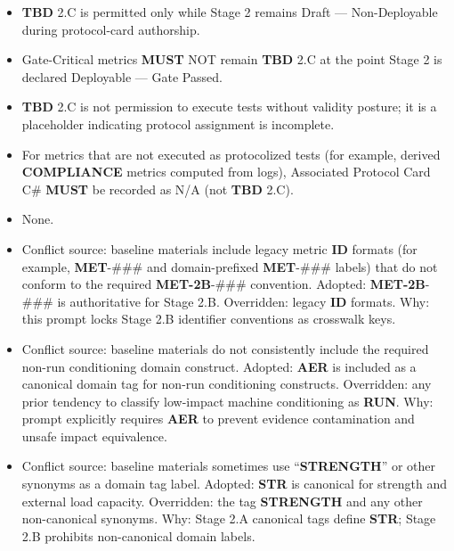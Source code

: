 \documentclass[10pt]{article}
\begin{document}
\begin{itemize}
\item \textbf{TBD} 2.C is permitted only while Stage 2 remains Draft — Non-Deployable during protocol-card authorship.
\item Gate-Critical metrics \textbf{MUST} NOT remain \textbf{TBD} 2.C at the point Stage 2 is declared Deployable — Gate Passed.
\item \textbf{TBD} 2.C is not permission to execute tests without validity posture; it is a placeholder indicating protocol assignment is incomplete.
\item For metrics that are not executed as protocolized tests (for example, derived \textbf{COMPLIANCE} metrics computed from logs), Associated Protocol Card C\# \textbf{MUST} be recorded as N/A (not \textbf{TBD} 2.C).
\end{itemize}

\begin{itemize}
\item None.
\end{itemize}

\begin{itemize}
\item Conflict source: baseline materials include legacy metric \textbf{ID} formats (for example, \textbf{MET}-\#\#\# and domain-prefixed \textbf{MET}-\#\#\# labels) that do not conform to the required \textbf{MET-2B}-\#\#\# convention. Adopted: \textbf{MET-2B}-\#\#\# is authoritative for Stage 2.B. Overridden: legacy \textbf{ID} formats. Why: this prompt locks Stage 2.B identifier conventions as crosswalk keys.
\item Conflict source: baseline materials do not consistently include the required non-run conditioning domain construct. Adopted: \textbf{AER} is included as a canonical domain tag for non-run conditioning constructs. Overridden: any prior tendency to classify low-impact machine conditioning as \textbf{RUN}. Why: prompt explicitly requires \textbf{AER} to prevent evidence contamination and unsafe impact equivalence.
\item Conflict source: baseline materials sometimes use “\textbf{STRENGTH}” or other synonyms as a domain tag label. Adopted: \textbf{STR} is canonical for strength and external load capacity. Overridden: the tag \textbf{STRENGTH} and any other non-canonical synonyms. Why: Stage 2.A canonical tags define \textbf{STR}; Stage 2.B prohibits non-canonical domain labels.
\end{itemize}
\end{document}
